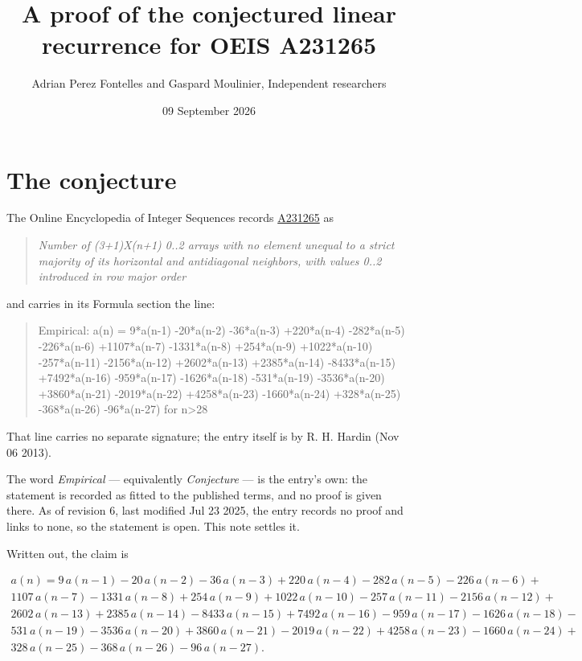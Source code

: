 \documentclass[11pt]{article}
\title{A proof of the conjectured linear recurrence for OEIS A231265}
\author{Adrian Perez Fontelles and Gaspard Moulinier, Independent researchers}
\date{09 September 2026}
\theoremstyle{definition}
\begin{document}
\maketitle
\section{The conjecture}

The Online Encyclopedia of Integer Sequences records \href{https://oeis.org/A231265}{A231265} as

\begin{quote}\itshape Number of (3+1)X(n+1) 0..2 arrays with no element unequal to a strict majority of its horizontal and antidiagonal neighbors, with values 0..2 introduced in row major order\end{quote}

and carries in its Formula section the line:

\begin{quote}\ttfamily Empirical: a(n) = 9*a(n-1) -20*a(n-2) -36*a(n-3) +220*a(n-4) -282*a(n-5) -226*a(n-6) +1107*a(n-7) -1331*a(n-8) +254*a(n-9) +1022*a(n-10) -257*a(n-11) -2156*a(n-12) +2602*a(n-13) +2385*a(n-14) -8433*a(n-15) +7492*a(n-16) -959*a(n-17) -1626*a(n-18) -531*a(n-19) -3536*a(n-20) +3860*a(n-21) -2019*a(n-22) +4258*a(n-23) -1660*a(n-24) +328*a(n-25) -368*a(n-26) -96*a(n-27) for n>28\end{quote}

That line carries no separate signature; the entry itself is by R. H. Hardin (Nov 06 2013).

The word {\itshape Empirical} --- equivalently {\itshape Conjecture} --- is the entry's own: the statement is recorded as fitted to the published terms, and no proof is given there. As of revision 6, last modified Jul 23 2025, the entry records no proof and links to none, so the statement is open. This note settles it.

Written out, the claim is

\begin{multline*} a(n) = 9\,a(n-1) - 20\,a(n-2) - 36\,a(n-3) + 220\,a(n-4) - 282\,a(n-5) - 226\,a(n-6) + \\ 1107\,a(n-7) - 1331\,a(n-8) + 254\,a(n-9) + 1022\,a(n-10) - 257\,a(n-11) - 2156\,a(n-12) + \\ 2602\,a(n-13) + 2385\,a(n-14) - 8433\,a(n-15) + 7492\,a(n-16) - 959\,a(n-17) - 1626\,a(n-18) - \\ 531\,a(n-19) - 3536\,a(n-20) + 3860\,a(n-21) - 2019\,a(n-22) + 4258\,a(n-23) - 1660\,a(n-24) + \\ 328\,a(n-25) - 368\,a(n-26) - 96\,a(n-27). \end{multline*}
\end{document}
